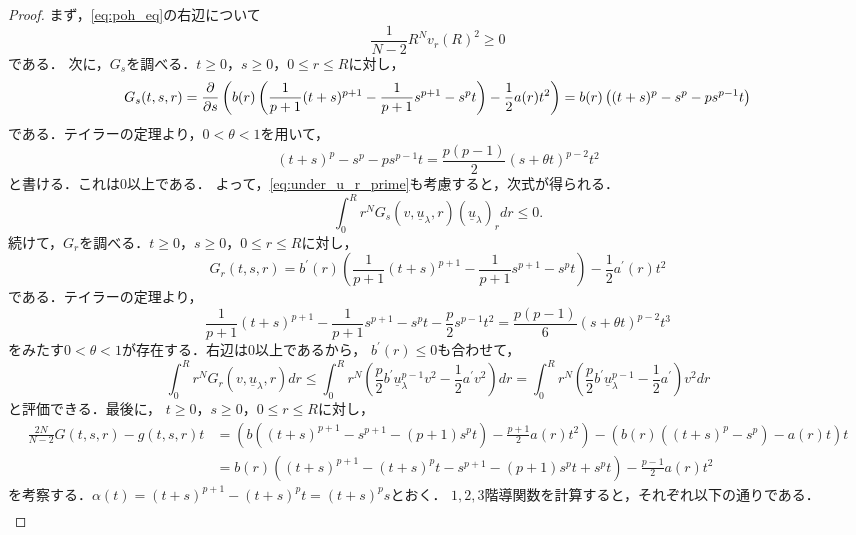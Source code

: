 \begin{proof}
 まず，\eqref{eq:poh_eq}の右辺について
 \begin{equation}
  \frac{1}{N-2} R^N v_r(R)^2 \geq 0 \label{eq:poh_ineq_0}
 \end{equation}
 である．
 次に，$G_s$を調べる．$t \geq 0 $，$s \geq 0$，$0 \leq r \leq R$に対し，
 \[
  G_s(t, s, r) = \frac{\partial }{\partial s} \left( b(r) \left( \frac{1}{p+1}
 (t+s)^{p+1} - \frac{1}{p+1}s^{p+1} - s^pt \right)
 - \frac{1}{2}a(r) t^2 \right) = b(r) \left( (t+s)^p - s^p -p s^{p-1}
 t \right)
 \]
 である．テイラーの定理より，$0 < \theta < 1$を用いて，
 \[
  (t+s)^p - s^p - ps^{p-1} t = \frac{p(p-1)}{2} (s + \theta t)^{p-2} t^2
 \]
 と書ける．これは$0$以上である．
 よって，\eqref{eq:under_u_r_prime}も考慮すると，次式が得られる．
 \begin{equation}
  \int_0^R r^N G_s(v, \underline{u}_\lambda, r)
   (\underline{u}_\lambda)_r dr \leq 0. \label{eq:poh_ineq_1}
 \end{equation}
 続けて，$G_r$を調べる．$t \geq 0 $，$s \geq 0$，$0 \leq r \leq R$に対し，
 \[
  G_r(t, s, r) = b^\prime(r) \left( \frac{1}{p+1} (t+s)^{p+1} -
 \frac{1}{p+1} s^{p+1} - s^{p} t \right) - \frac{1}{2} a^\prime(r) t^2
 \]
 である．テイラーの定理より，
 \[
  \frac{1}{p+1} (t+s)^{p+1} - \frac{1}{p+1} s^{p+1} -s^p t -
 \frac{p}{2} s^{p-1} t^2 = \frac{p(p-1)}{6} (s + \theta t)^{p-2} t^3
 \]
 をみたす$0 < \theta < 1$が存在する．右辺は$0$以上であるから，
 $b^\prime(r) \leq 0$も合わせて，
 \begin{equation}
  \int_0^R r^N G_r(v, \underline{u}_\lambda, r) dr \leq \int_0^R
   r^N \left( \frac{p}{2} b^\prime \underline{u}_\lambda^{p-1} v^2 -
    \frac{1}{2} a^\prime v^2 \right)dr = 
   \int_0^R r^N \left( \frac{p}{2} b^\prime \underline{u}_\lambda^{p-1} -
    \frac{1}{2} a^\prime \right) v^2 dr \label{eq:poh_ineq_2} 
 \end{equation}
 と評価できる．最後に，
 $t \geq 0 $，$s \geq 0$，$0 \leq r \leq R$に対し，
 \begin{align*}
  \frac{2N}{N-2}G(t, s, r) - g(t, s, r)t 
  &= \left( b \left( (t+s)^{p+1} - s^{p+1} - (p+1)s^p t \right) -
  \frac{p+1}{2} a(r) t^2 \right) - \left( b(r) \left( (t+s)^p - s^p
  \right) - a(r) t \right) t \\
  &= b(r) \left( (t+s)^{p+1} - (t+s)^p t - s^{p+1} - (p+1)s^p t + s^p
  t \right) -\frac{p-1}{2} a(r) t^2
 \end{align*}
 を考察する．$\alpha(t) = (t+s)^{p+1} - (t+s)^p t = (t+s)^p s$とおく．
 $1, 2, 3$階導関数を計算すると，それぞれ以下の通りである．
 \begin{align*}

\end{align*}
\end{proof}
